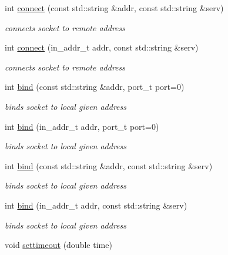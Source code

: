 \begin{CompactItemize}
int \hyperlink{classsocketpp_1_1BaseSocket_ec01996bf257fdf9d71c1c3eb6bb6519}{connect} (const std::string \&addr, const std::string \&serv)
\begin{CompactList}\small\item\em connects socket to remote address \item\end{CompactList}\item 
int \hyperlink{classsocketpp_1_1BaseSocket_7603795bfbcf43a4167fedc8fe8fe5b3}{connect} (in\_\-addr\_\-t addr, const std::string \&serv)
\begin{CompactList}\small\item\em connects socket to remote address \item\end{CompactList}\item 
int \hyperlink{classsocketpp_1_1BaseSocket_78c2a8e6a5c7dfbc708c9cd637e88e51}{bind} (const std::string \&addr, port\_\-t port=0)
\begin{CompactList}\small\item\em binds socket to local given address \item\end{CompactList}\item 
int \hyperlink{classsocketpp_1_1BaseSocket_d3df73f534900d40f9dff26171ec93b5}{bind} (in\_\-addr\_\-t addr, port\_\-t port=0)
\begin{CompactList}\small\item\em binds socket to local given address \item\end{CompactList}\item 
int \hyperlink{classsocketpp_1_1BaseSocket_c82e79c07750af528b8bd705f0910e43}{bind} (const std::string \&addr, const std::string \&serv)
\begin{CompactList}\small\item\em binds socket to local given address \item\end{CompactList}\item 
int \hyperlink{classsocketpp_1_1BaseSocket_1b1249c5843a5d9205a6599670addf87}{bind} (in\_\-addr\_\-t addr, const std::string \&serv)
\begin{CompactList}\small\item\em binds socket to local given address \item\end{CompactList}\item 
void \hyperlink{classsocketpp_1_1BaseSocket_0804d148470fd742cda495d3533b25c6}{settimeout} (double time)

\end{CompactItemize}
